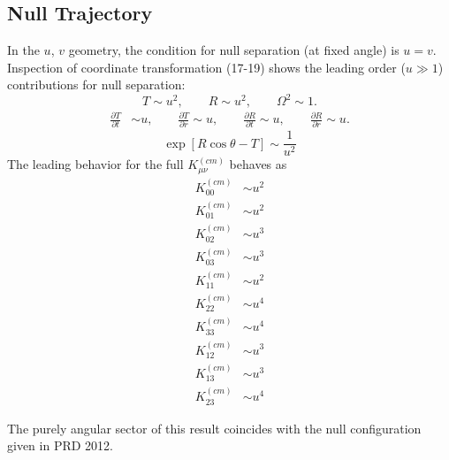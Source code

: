 \documentclass[10pt,letterpaper]{article}
\begin{document}
\subsection*{Null Trajectory}
In the $u$, $v$ geometry, the condition for null separation (at fixed angle) is $u=v$. Inspection of coordinate transformation (17-19) shows the leading order ($u\gg 1$) contributions for null separation:
\begin{equation}
T \sim u^2,\qquad R \sim u^2,\qquad \Omega^2 \sim 1. 
\end{equation}
\begin{align}
\frac{\partial T}{\partial t} & \sim  u,\qquad
\frac{\partial T}{\partial r}  \sim 	u,\qquad
\frac{\partial R}{\partial t}  \sim u,\qquad
\frac{\partial R}{\partial r}  \sim  u.
\end{align}
\begin{equation}
\exp[R\cos\theta-T] \sim \frac{1}{u^2}
\end{equation}
The leading behavior for the full $K_{\mu\nu}^{(cm)}$ behaves as
\begin{align}
K^{(cm)}_{00} &\sim u^2 \nonumber\\
K^{(cm)}_{01} &\sim  u^2\nonumber\\
K^{(cm)}_{02} &\sim  u^3\nonumber\\
K^{(cm)}_{03} &\sim   u^3\nonumber\\
K^{(cm)}_{11} &\sim  u^2\nonumber\\
K^{(cm)}_{22} &\sim  u^4\nonumber\\
K^{(cm)}_{33} &\sim  u^4\nonumber\\
K^{(cm)}_{12} &\sim u^3\nonumber\\
K^{(cm)}_{13} &\sim u^3\nonumber\\
K^{(cm)}_{23} &\sim u^4
\end{align}

The purely angular sector of this result coincides with the null configuration given in PRD 2012.
\end{document}
